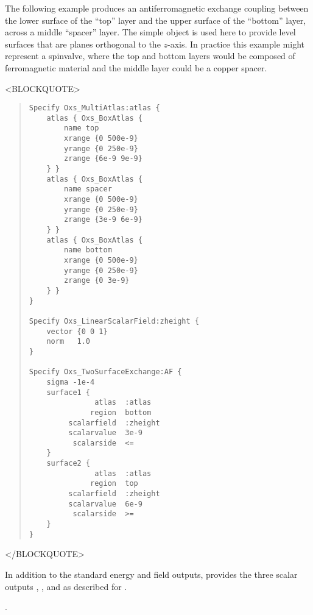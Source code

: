 \begin{description}
   The following example produces an antiferromagnetic exchange coupling
   between the lower surface of the ``top'' layer and the upper surface
   of the ``bottom'' layer, across a middle ``spacer'' layer.  The
   simple  object is used here to provide
   level surfaces that are planes orthogonal to the $z$-axis.  In
   practice this example might represent a spinvalve, where the top and
   bottom layers would be composed of ferromagnetic material and the
   middle layer could be a copper spacer.
\begin{rawhtml}
<BLOCKQUOTE>
\end{rawhtml}
\begin{quote}
\begin{verbatim}
Specify Oxs_MultiAtlas:atlas {
    atlas { Oxs_BoxAtlas {
        name top
        xrange {0 500e-9}
        yrange {0 250e-9}
        zrange {6e-9 9e-9}
    } }
    atlas { Oxs_BoxAtlas {
        name spacer
        xrange {0 500e-9}
        yrange {0 250e-9}
        zrange {3e-9 6e-9}
    } }
    atlas { Oxs_BoxAtlas {
        name bottom
        xrange {0 500e-9}
        yrange {0 250e-9}
        zrange {0 3e-9}
    } }
}

Specify Oxs_LinearScalarField:zheight {
    vector {0 0 1}
    norm   1.0
}

Specify Oxs_TwoSurfaceExchange:AF {
    sigma -1e-4
    surface1 {
               atlas  :atlas
              region  bottom
         scalarfield  :zheight
         scalarvalue  3e-9
          scalarside  <=
    }
    surface2 {
               atlas  :atlas
              region  top
         scalarfield  :zheight
         scalarvalue  6e-9
          scalarside  >=
    }
}
\end{verbatim}
\end{quote}
\begin{rawhtml}
</BLOCKQUOTE>
\end{rawhtml}

   In addition to the standard energy and field outputs,
    provides the three scalar outputs
   , , and
    as described for .

\begin{ExampleMifs}[Example]
  .
\end{ExampleMifs}



\end{description}
